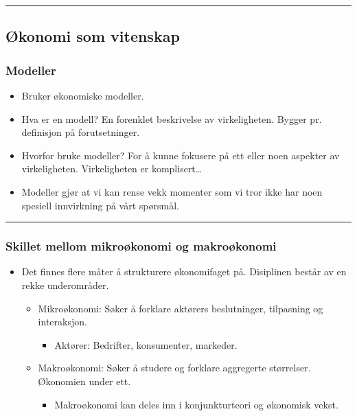 \documentclass[
  letterpaper,
  DIV=11,
  numbers=noendperiod]{scrartcl}
\providecommand{\tightlist}{%
  \setlength{\itemsep}{0pt}\setlength{\parskip}{0pt}}\usepackage{longtable,booktabs,array}
\begin{document}
\begin{center}\rule{0.5\linewidth}{0.5pt}\end{center}

\subsection{Økonomi som vitenskap}\label{uxf8konomi-som-vitenskap}

\subsubsection{Modeller}\label{modeller}

\begin{itemize}
\tightlist
\item
  Bruker økonomiske modeller.
\item
  Hva er en modell? En forenklet beskrivelse av virkeligheten. Bygger
  pr. definisjon på forutsetninger.
\item
  Hvorfor bruke modeller? For å kunne fokusere på ett eller noen
  aspekter av virkeligheten. Virkeligheten er komplisert\ldots{}
\item
  Modeller gjør at vi kan rense vekk momenter som vi tror ikke har noen
  spesiell innvirkning på vårt spørsmål.
\end{itemize}

\begin{center}\rule{0.5\linewidth}{0.5pt}\end{center}

\subsubsection{Skillet mellom mikroøkonomi og
makroøkonomi}\label{skillet-mellom-mikrouxf8konomi-og-makrouxf8konomi}

\begin{itemize}
\tightlist
\item
  Det finnes flere måter å strukturere økonomifaget på. Disiplinen
  består av en rekke underområder.

  \begin{itemize}
  \tightlist
  \item
    Mikroøkonomi: Søker å forklare aktørers beslutninger, tilpasning og
    interaksjon.

    \begin{itemize}
    \tightlist
    \item
      Aktører: Bedrifter, konsumenter, markeder.
    \end{itemize}
  \item
    Makroøkonomi: Søker å studere og forklare aggregerte størrelser.
    Økonomien under ett.

    \begin{itemize}
    \tightlist
    \item
      Makroøkonomi kan deles inn i konjunkturteori og økonomisk vekst.
    \end{itemize}
  \end{itemize}
\end{itemize}
\end{document}
